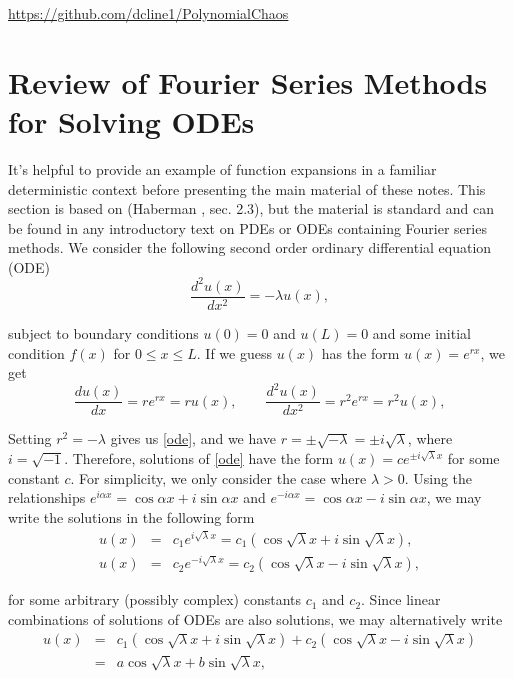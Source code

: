 \documentclass[11pt]{article}
\numberwithin{equation}{section}
\begin{document}
\begin{center}
\href{https://github.com/dcline1/PolynomialChaos/}{https://github.com/dcline1/PolynomialChaos}
\end{center}





\section{Review of Fourier Series Methods for Solving ODEs}

It's helpful to provide an example of function expansions in a familiar deterministic context before presenting the main material of these notes. This section is based on (Haberman \cite{H03}, sec. 2.3), but the material is standard and can be found in any introductory text on PDEs or ODEs containing Fourier series methods. We consider the following second order ordinary differential equation (ODE)
\begin{equation}
\frac{d^2 u(x)}{dx^2} = -\lambda u(x), \label{ode}
\end{equation}

subject to boundary conditions $u(0) = 0$ and $u(L) = 0$ and some initial condition $f(x)$ for $0 \leq x \leq L$. If we guess $u(x)$ has the form $u(x) = e^{rx}$, we get
\begin{equation*}
\frac{du(x)}{dx} = r e^{rx} = r u(x), \qquad \frac{d^2 u(x)}{dx^2} = r^2 e^{rx} = r^2 u(x),
\end{equation*}

Setting $r^2 = -\lambda$ gives us \eqref{ode}, and we have $r = \pm \sqrt{-\lambda} = \pm i \sqrt{\lambda}$, where $i = \sqrt{-1}$. Therefore, solutions of \eqref{ode} have the form $u(x) = c e^{\pm i \sqrt{\lambda} x}$ for some constant $c$. For simplicity, we only consider the case where $\lambda > 0$. Using the relationships $e^{i \alpha x} = \cos \alpha x + i \sin \alpha x$ and $e^{-i \alpha x} = \cos \alpha x - i \sin \alpha x$, we may write the solutions in the following form
\begin{eqnarray*}
u(x) & = & c_1 e^{i \sqrt{\lambda} x} = c_1 ( \cos \sqrt{\lambda} x + i \sin \sqrt{\lambda} x ), \\
u(x) & = & c_2 e^{-i \sqrt{\lambda} x} = c_2 ( \cos \sqrt{\lambda} x - i \sin \sqrt{\lambda} x ), 
\end{eqnarray*}

for some arbitrary (possibly complex) constants $c_1$ and $c_2$. Since linear combinations of solutions of ODEs are also solutions, we may alternatively write
\begin{eqnarray}
u(x) & = & c_1 ( \cos \sqrt{\lambda} x + i \sin \sqrt{\lambda} x ) +c_2 ( \cos \sqrt{\lambda} x - i \sin \sqrt{\lambda} x )  \nonumber \\
& = & a \cos \sqrt{\lambda} x + b \sin \sqrt{\lambda} x, \label{sol}
\end{eqnarray}
\end{document}
